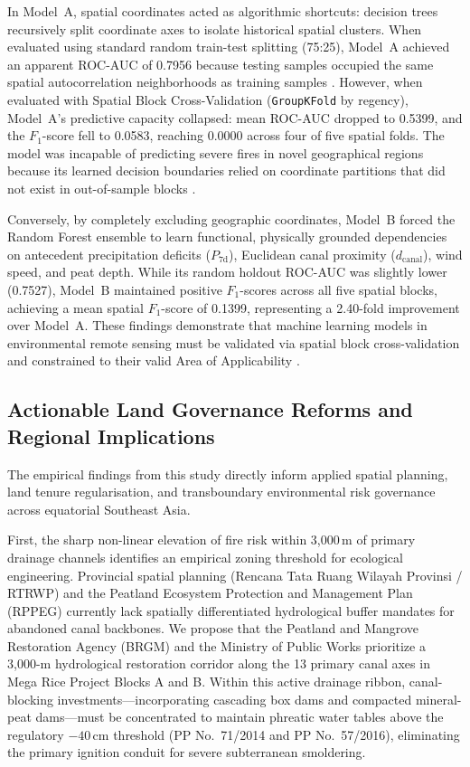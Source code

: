 In Model~A, spatial coordinates acted as algorithmic shortcuts: decision trees recursively split coordinate axes to isolate historical spatial clusters. When evaluated using standard random train-test splitting (75:25), Model~A achieved an apparent ROC-AUC of 0.7956 because testing samples occupied the same spatial autocorrelation neighborhoods as training samples \citep{Tobler1970EconGeogr, Legendre1993Ecology}. However, when evaluated with Spatial Block Cross-Validation (\texttt{GroupKFold} by regency), Model~A's predictive capacity collapsed: mean ROC-AUC dropped to 0.5399, and the $F_1$-score fell to 0.0583, reaching 0.0000 across four of five spatial folds. The model was incapable of predicting severe fires in novel geographical regions because its learned decision boundaries relied on coordinate partitions that did not exist in out-of-sample blocks \citep{Roberts2017Ecography, Wadoux2021EcolModel}.

Conversely, by completely excluding geographic coordinates, Model~B forced the Random Forest ensemble to learn functional, physically grounded dependencies on antecedent precipitation deficits ($P_{\text{7d}}$), Euclidean canal proximity ($d_{\text{canal}}$), wind speed, and peat depth. While its random holdout ROC-AUC was slightly lower (0.7527), Model~B maintained positive $F_1$-scores across all five spatial blocks, achieving a mean spatial $F_1$-score of 0.1399, representing a 2.40-fold improvement over Model~A. These findings demonstrate that machine learning models in environmental remote sensing must be validated via spatial block cross-validation and constrained to their valid Area of Applicability \citep{MeyerPebesma2021NatComm, Schratz2019EcolModel}.

\subsection{Actionable Land Governance Reforms and Regional Implications}
\label{subsec:disc_spatial_planning_haze}

The empirical findings from this study directly inform applied spatial planning, land tenure regularisation, and transboundary environmental risk governance across equatorial Southeast Asia.

First, the sharp non-linear elevation of fire risk within 3,000\,m of primary drainage channels identifies an empirical zoning threshold for ecological engineering. Provincial spatial planning (Rencana Tata Ruang Wilayah Provinsi / RTRWP) and the Peatland Ecosystem Protection and Management Plan (RPPEG) currently lack spatially differentiated hydrological buffer mandates for abandoned canal backbones. We propose that the Peatland and Mangrove Restoration Agency (BRGM) and the Ministry of Public Works prioritize a 3,000-m hydrological restoration corridor along the 13 primary canal axes in Mega Rice Project Blocks A and B. Within this active drainage ribbon, canal-blocking investments---incorporating cascading box dams and compacted mineral-peat dams---must be concentrated to maintain phreatic water tables above the regulatory $-40$\,cm threshold (PP No.~71/2014 and PP No.~57/2016), eliminating the primary ignition conduit for severe subterranean smoldering.

